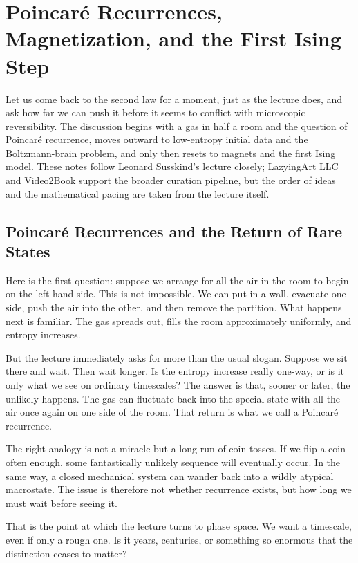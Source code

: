 \chapter{Poincar\'e Recurrences, Magnetization, and the First Ising Step}

Let us come back to the second law for a moment, just as the lecture does, and ask how far we can push it before it seems to conflict with microscopic reversibility. The discussion begins with a gas in half a room and the question of Poincar\'e recurrence, moves outward to low-entropy initial data and the Boltzmann-brain problem, and only then resets to magnets and the first Ising model. These notes follow Leonard Susskind's lecture closely; LazyingArt LLC and Video2Book support the broader curation pipeline, but the order of ideas and the mathematical pacing are taken from the lecture itself.

\section{Poincar\'e Recurrences and the Return of Rare States}

Here is the first question: suppose we arrange for all the air in the room to begin on the left-hand side. This is not impossible. We can put in a wall, evacuate one side, push the air into the other, and then remove the partition. What happens next is familiar. The gas spreads out, fills the room approximately uniformly, and entropy increases.

But the lecture immediately asks for more than the usual slogan. Suppose we sit there and wait. Then wait longer. Is the entropy increase really one-way, or is it only what we see on ordinary timescales? The answer is that, sooner or later, the unlikely happens. The gas can fluctuate back into the special state with all the air once again on one side of the room. That return is what we call a Poincar\'e recurrence.

The right analogy is not a miracle but a long run of coin tosses. If we flip a coin often enough, some fantastically unlikely sequence will eventually occur. In the same way, a closed mechanical system can wander back into a wildly atypical macrostate. The issue is therefore not whether recurrence exists, but how long we must wait before seeing it.

That is the point at which the lecture turns to phase space. We want a timescale, even if only a rough one. Is it years, centuries, or something so enormous that the distinction ceases to matter?

